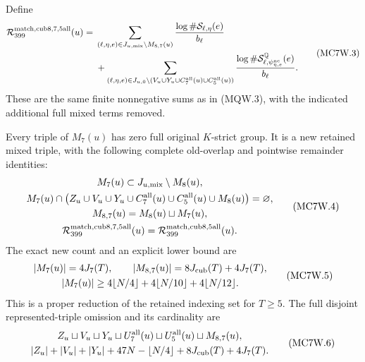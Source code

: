 Define
\[
 \begin{split}
 \mathcal R_{399}^{\rm match,cub8,7,5all}(u)={}&
  \sum_{(\ell,\eta,e)\in J_{u,\rm mix}\setminus M_{8,7}(u)}
                      \frac{\log\#\mathcal S_{\ell,\eta}(e)}{b_\ell}\\
 &+\sum_{(\ell,\eta,e)\in
      J_{u,0}\setminus(V_u\cup Y_u\cup C_7^{\rm all}(u)
                                      \cup C_5^{\rm all}(u))}
       \frac{\log\#\mathcal S^{\mathbb Q}_{\ell,
                           \psi_{\eta,e}^{\rm nc}}(e)}{b_\ell}.
 \end{split}\tag{MC7W.3}
\]
These are the same finite nonnegative sums as in (MQW.3),
with the indicated additional full mixed terms removed.

\begin{theorem}
\label{AC-G210-window}
Every triple of $M_7(u)$ has zero full original $K$-strict group.
It is a new retained mixed triple, with the following complete
old-overlap and pointwise remainder identities:
\[
 \begin{gathered}
 M_7(u)\subset J_{u,\rm mix}\setminus M_8(u),\\
 M_7(u)\cap\bigl(Z_u\cup V_u\cup Y_u\cup C_7^{\rm all}(u)
                            \cup C_5^{\rm all}(u)\cup M_8(u)\bigr)
                                            =\varnothing,\\
 M_{8,7}(u)=M_8(u)\sqcup M_7(u),\\
 \mathcal R_{399}^{\rm match,cub8,7,5all}(u)
                     =\mathcal R_{399}^{\rm match,cub8,5all}(u).
 \end{gathered}\tag{MC7W.4}
\]
The exact new count and an explicit lower bound are
\[
 \begin{gathered}
 |M_7(u)|=4J_7(T),\qquad
 |M_{8,7}(u)|=8J_{\rm cub}(T)+4J_7(T),\\
 |M_7(u)|\geq4\lfloor N/4\rfloor+4\lfloor N/10\rfloor
                                      +4\lfloor N/12\rfloor.
 \end{gathered}\tag{MC7W.5}
\]
This is a proper reduction of the retained indexing set for $T\geq5$.
The full disjoint represented-triple omission and its cardinality are
\[
 \begin{gathered}
 Z_u\sqcup V_u\sqcup Y_u\sqcup U_7^{\rm all}(u)
                 \sqcup U_5^{\rm all}(u)\sqcup M_{8,7}(u),\\
 |Z_u|+|V_u|+|Y_u|+47N-\lfloor N/4\rfloor
                            +8J_{\rm cub}(T)+4J_7(T).
 \end{gathered}\tag{MC7W.6}
\]
\end{theorem}
